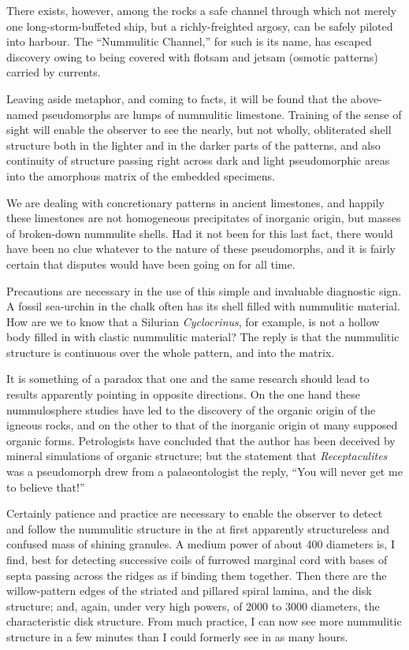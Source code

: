 \documentclass[a4paper, 12pt, oneside]{article}
\begin{document}
There exists, however, among the rocks a safe channel through which not merely one long-storm-buffeted ship, but a richly-freighted argosy, can be safely piloted into harbour. The ``Nummulitic Channel,'' for such is its name, has escaped discovery owing to being covered with flotsam and jetsam (osmotic patterns) carried by currents.

Leaving aside metaphor, and coming to facts, it will be found that the above-named pseudomorphs are lumps of nummulitic limestone. Training of the sense of sight will enable the observer to see the nearly, but not wholly, obliterated shell structure both in the lighter and in the darker parts of the patterns, and also continuity of structure passing right across dark and light pseudomorphic areas into the amorphous matrix of the embedded specimens.

We are dealing with concretionary patterns in ancient limestones, and happily these limestones are not homogeneous precipitates of inorganic origin, but masses of broken-down nummulite shells. Had it not been for this last fact, there would have been no clue whatever to the nature of these pseudomorphs, and it is fairly certain that disputes would have been going on for all time.

Precautions are necessary in the use of this simple and invaluable diagnostic sign. A fossil sea-urchin in the chalk often has its shell filled with nummulitic material. How are we to know that a Silurian \emph{Cyclocrinus}, for example, is not a hollow body filled in with clastic nummulitic material? The reply is that the nummulitic structure is continuous over the whole pattern, and into the matrix.

It is something of a paradox that one and the same research should lead to results apparently pointing in opposite directions. On the one hand these nummulosphere studies have led to the discovery of the organic origin of the igneous rocks, and on the other to that of the inorganic origin ot many supposed organic forms. Petrologists have concluded that the author has been deceived by mineral simulations of organic structure; but the statement that \emph{Receptaculites} was a pseudomorph drew from a palaeontologist the reply, ``You will never get me to believe that!''

Certainly patience and practice are necessary to enable the observer to detect and follow the nummulitic structure in the at first apparently structureless and confused mass of shining granules. A medium power of about 400 diameters is, I find, best for detecting successive coils of furrowed marginal cord with bases of septa passing across the ridges as if binding them together. Then there are the willow-pattern edges of the striated and pillared spiral lamina, and the disk structure; and, again, under very high powers, of 2000 to 3000 diameters, the characteristic disk structure. From much practice, I can now see more nummulitic structure in a few minutes than I could formerly see in as many hours.
\end{document}

